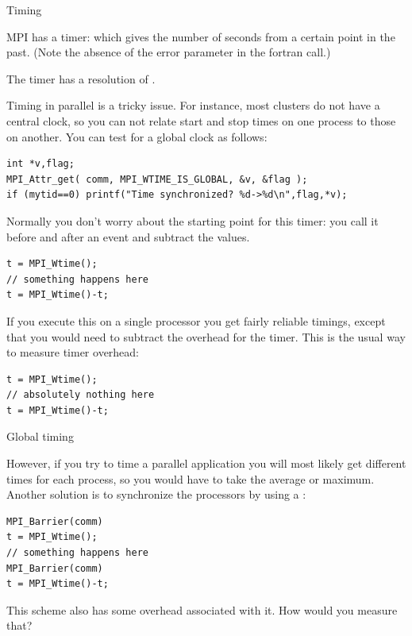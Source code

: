 

 {Timing}
\label{sec:mpi-timing}

MPI has a  timer: 
which gives the number of seconds from a certain point in the past.
(Note the absence of the error parameter in the fortran call.)
%

The timer has a resolution of .

Timing in parallel is a tricky issue. For instance, most clusters do
not have a central clock, so you can not relate start and stop times
on one process to those on another. You can test for a global clock as
follows:
\begin{lstlisting}
int *v,flag;
MPI_Attr_get( comm, MPI_WTIME_IS_GLOBAL, &v, &flag );
if (mytid==0) printf("Time synchronized? %d->%d\n",flag,*v);
\end{lstlisting}

Normally you don't worry about the starting point for this timer: 
you call it before and after an event and subtract the values.
\begin{lstlisting}
t = MPI_Wtime();
// something happens here
t = MPI_Wtime()-t;
\end{lstlisting}
If you execute this on a single processor you get fairly reliable
timings, except that you would need to subtract the overhead for the
timer. This is the usual way to measure timer overhead:
\begin{lstlisting}
t = MPI_Wtime();
// absolutely nothing here
t = MPI_Wtime()-t;
\end{lstlisting}

 {Global timing}

However, if you try to time a parallel application you will most likely
get different times for each process, so you would have to take the
average or maximum.  Another solution is to synchronize the processors
by using a :
\begin{lstlisting}
MPI_Barrier(comm)
t = MPI_Wtime();
// something happens here
MPI_Barrier(comm)
t = MPI_Wtime()-t;
\end{lstlisting}

\begin{exercise}
  This scheme also has some overhead associated with it. How would you measure that?
\end{exercise}


